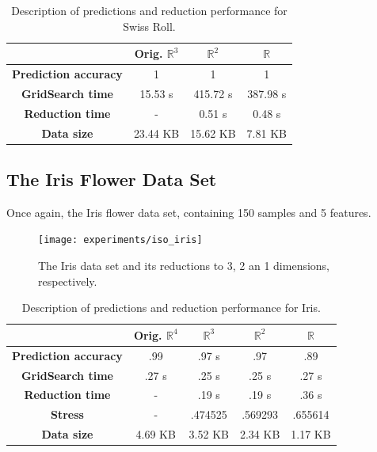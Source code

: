 \begin{table}[H]
	\centering
	\begin{tabular}{|c|c|c|c|}
		\hline
		& \textbf{Orig. $\mathbb{R}^3$} & \textbf{$\mathbb{R}^2$} & \textbf{$\mathbb{R}$} \\\hline
		\textbf{Prediction accuracy}   & 1            & 1             & 1     \\\hline
		\textbf{GridSearch time} & 15.53 s   & 415.72 s  & 387.98 s  \\\hline
		\textbf{Reduction time}  & -         & 0.51 s       & 0.48 s     \\\hline
		\textbf{Data size}          & 23.44 KB & 15.62 KB  & 7.81 KB   \\\hline
	\end{tabular}
	
	\caption{Description of predictions and reduction performance for Swiss Roll.}
\end{table}

\subsection{The Iris Flower Data Set}

Once again, the Iris flower data set, containing 150 samples and 5 features.

\begin{figure}[H]
	\centering
	\texttt{[image: experiments/iso\_iris]}
	\captionsetup{justification=centering}
	\caption{The Iris data set and its reductions to 3, 2 an 1 dimensions, respectively.}
\end{figure}

\begin{table}[H]
	\centering
	\begin{tabular}{|c|c|c|c|c|}
		\hline
		& \textbf{Orig. $\mathbb{R}^4$} & \textbf{$\mathbb{R}^3$} & \textbf{$\mathbb{R}^2$} & \textbf{$\mathbb{R}$} \\\hline
		\textbf{Prediction accuracy}   & .99      & .97  s             & .97             & .89           \\\hline
		\textbf{GridSearch time}           & .27 s   & .25 s              & .25 s         & .27 s        \\\hline
		\textbf{Reduction time}             & -           & .19 s              & .19 s          & .36 s        \\\hline
		\textbf{Stress}                                  & -           & .474525      & .569293   & .655614 \\\hline
		\textbf{Data size}                           & 4.69 KB & 3.52 KB  & 2.34 KB   & 1.17 KB  \\\hline
	\end{tabular}
	
	\caption{Description of predictions and reduction performance for Iris.}
\end{table}

